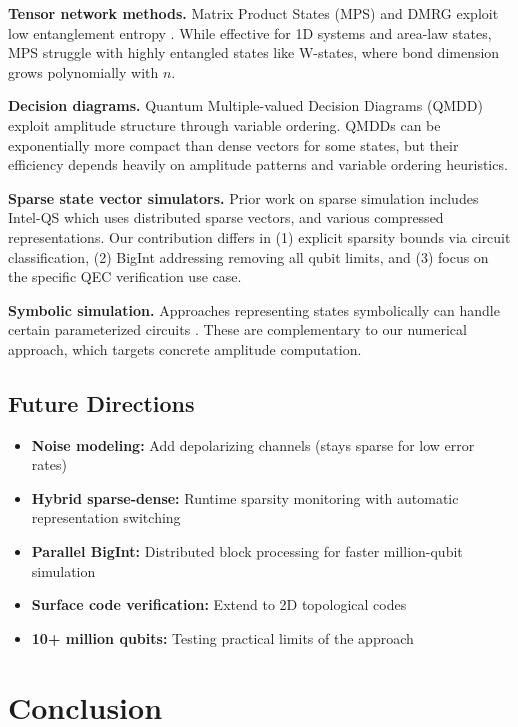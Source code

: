 \documentclass[11pt,twocolumn]{article}
\begin{document}
\textbf{Tensor network methods.} Matrix Product States (MPS) and DMRG exploit low entanglement entropy \cite{schollwock2011dmrg}. While effective for 1D systems and area-law states, MPS struggle with highly entangled states like W-states, where bond dimension grows polynomially with $n$.

\textbf{Decision diagrams.} Quantum Multiple-valued Decision Diagrams (QMDD) \cite{miller2006qmdd} exploit amplitude structure through variable ordering. QMDDs can be exponentially more compact than dense vectors for some states, but their efficiency depends heavily on amplitude patterns and variable ordering heuristics.

\textbf{Sparse state vector simulators.} Prior work on sparse simulation includes Intel-QS \cite{guerreschi2020intelqs} which uses distributed sparse vectors, and various compressed representations. Our contribution differs in (1) explicit sparsity bounds via circuit classification, (2) BigInt addressing removing all qubit limits, and (3) focus on the specific QEC verification use case.

\textbf{Symbolic simulation.} Approaches representing states symbolically can handle certain parameterized circuits \cite{amy2018symbolic}. These are complementary to our numerical approach, which targets concrete amplitude computation.

\subsection{Future Directions}

\begin{itemize}
    \item \textbf{Noise modeling:} Add depolarizing channels (stays sparse for low error rates)
    \item \textbf{Hybrid sparse-dense:} Runtime sparsity monitoring with automatic representation switching
    \item \textbf{Parallel BigInt:} Distributed block processing for faster million-qubit simulation
    \item \textbf{Surface code verification:} Extend to 2D topological codes
    \item \textbf{10+ million qubits:} Testing practical limits of the approach
\end{itemize}

\section{Conclusion}
\end{document}

